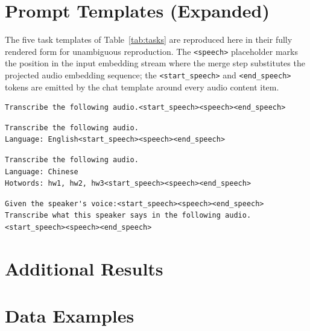 \section{Prompt Templates (Expanded)}
\label{app:prompts}

The five task templates of Table~\ref{tab:tasks} are reproduced here
in their fully rendered form for unambiguous reproduction. The
\verb|<speech>| placeholder marks the position in the input
embedding stream where the merge step substitutes the projected
audio embedding sequence; the
\verb|<start_speech>| and \verb|<end_speech>| tokens are emitted by
the chat template around every audio content item.

\begin{lstlisting}[style=plain, caption={Plain ASR prompt (no language hint, no hotwords).}]
Transcribe the following audio.<start_speech><speech><end_speech>
\end{lstlisting}

\begin{lstlisting}[style=plain, caption={Mandarin or English ASR with a language hint.}]
Transcribe the following audio.
Language: English<start_speech><speech><end_speech>
\end{lstlisting}

\begin{lstlisting}[style=plain, caption={Hotword-conditioned ASR; the language hint is optional.}]
Transcribe the following audio.
Language: Chinese
Hotwords: hw1, hw2, hw3<start_speech><speech><end_speech>
\end{lstlisting}

\begin{lstlisting}[style=plain, caption={Target-speaker ASR. The enrollment block precedes the mixed audio; the language and hotword lines are optional and follow the same convention as Hotword ASR.}]
Given the speaker's voice:<start_speech><speech><end_speech>
Transcribe what this speaker says in the following audio.<start_speech><speech><end_speech>
\end{lstlisting}

\section{Additional Results}
\label{app:more_results}


\section{Data Examples}
\label{app:data_examples}

